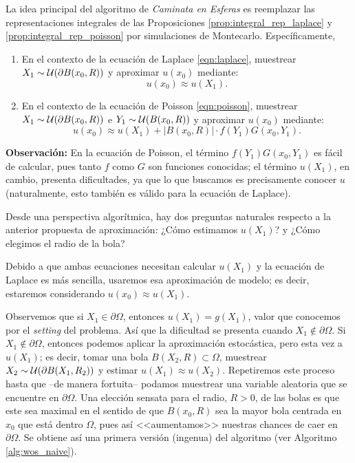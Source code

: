 La idea principal del algoritmo de \textit{Caminata en Esferas} es reemplazar las representaciones integrales de las Proposiciones \ref{prop:integral_rep_laplace} y \ref{prop:integral_rep_poisson} por simulaciones de Montecarlo. Específicamente,
\begin{enumerate}
    \item En el contexto de la ecuación de Laplace \eqref{eqn:laplace}, muestrear $X_1\sim {\cal U}(\partial B(x_0,R))$ y aproximar $u(x_0)$ mediante:
    $$u(x_0)\approx u(X_1).$$
    \item En el contexto de la ecuación de Poisson \eqref{eqn:poisson}, muestrear $X_1\sim {\cal U}(\partial B(x_0,R))$ e $Y_1\sim {\cal U}(B(x_0,R))$ y aproximar $u(x_0)$ mediante:
    $$u(x_0)\approx u(X_1) + \left|B(x_0,R)\right|\cdot f(Y_1)G(x_0,Y_1).$$
\end{enumerate}

\textbf{Observación:}
    En la ecuación de Poisson, el término $f(Y_1)G(x_0,Y_1)$ es fácil de calcular, pues tanto $f$ como $G$ son funciones conocidas; el término $u(X_1)$, en cambio, presenta dificultades, ya que lo que buscamos es precisamente conocer $u$ (naturalmente, esto también es válido para la ecuación de Laplace).

Desde una perspectiva algorítmica, hay dos preguntas naturales respecto a la anterior propuesta de aproximación: ¿Cómo estimamos $u(X_1)$? y ¿Cómo elegimos el radio de la bola?

Debido a que ambas ecuaciones necesitan calcular $u(X_1)$ y la ecuación de Laplace es más sencilla, usaremos esa aproximación de modelo; es decir, estaremos considerando $u(x_0)\approx u(X_1)$.

Observemos que si $X_1\in\partial\Omega$, entonces $u(X_1)=g(X_1)$, valor que conocemos por el \textit{setting} del problema. Así que la dificultad se presenta cuando $X_1\notin\partial \Omega$. Si $X_1\notin\partial\Omega$, entonces podemos aplicar la aproximación estocástica, pero esta vez a $u(X_1)$; es decir, tomar una bola $B(X_2,R)\subset\Omega$, muestrear $X_2\sim {\cal U}(\partial B(X_1,R_2))$ y estimar $u(X_1)\approx u(X_2)$. Repetiremos este proceso hasta que --de manera fortuita-- podamos muestrear una variable aleatoria que se encuentre en $\partial \Omega$. Una elección sensata para el radio, $R>0$, de las bolas es que este sea maximal en el sentido de que $B(x_0,R)$ sea la mayor bola centrada en $x_0$ que está dentro $\Omega$, pues así <<aumentamos>> nuestras chances de caer en $\partial\Omega$. Se obtiene así  una primera versión (ingenua) del algoritmo (ver Algoritmo \ref{alg:wos_naive}).

